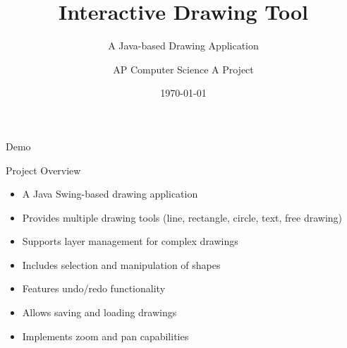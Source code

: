 \documentclass{beamer}
\title{Interactive Drawing Tool}
\subtitle{A Java-based Drawing Application}
\author{AP Computer Science A Project}
\date{\today}
\begin{document}
\begin{frame}
\titlepage
\end{frame}

\begin{frame}{Demo}
\begin{center}


\end{center}
\end{frame}

\begin{frame}{Project Overview}
\begin{itemize}
\item A Java Swing-based drawing application
\item Provides multiple drawing tools (line, rectangle, circle, text, free drawing)
\item Supports layer management for complex drawings
\item Includes selection and manipulation of shapes
\item Features undo/redo functionality
\item Allows saving and loading drawings
\item Implements zoom and pan capabilities
\end{itemize}
\end{frame}
\end{document}
